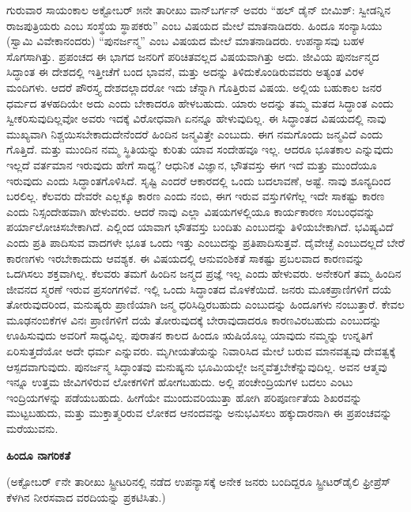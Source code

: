 ಗುರುವಾರ ಸಾಯಂಕಾಲ ಅಕ್ಟೋಬರ್​ ೫ನೇ ತಾರೀಖು ವಾನ್​ಬರ್ಗನ್​ ಅವರು “ಹಲ್​ ಡೈನ್​ ಬೀಮಿಶ್​: ಸ್ವೀಡನ್ನಿನ ರಾಜಪುತ್ರಿಯರು ಎಂಬ ಸಂಸ್ಥೆಯ ಸ್ಥಾಪಕರು” ಎಂಬ ವಿಷಯದ ಮೇಲೆ ಮಾತನಾಡಿದರು. ಹಿಂದೂ ಸಂನ್ಯಾಸಿಯು (ಸ್ವಾಮಿ ವಿವೇಕಾನಂದರು) “ಪುನರ್ಜನ್ಮ” ಎಂಬ ವಿಷಯದ ಮೇಲೆ ಮಾತನಾಡಿದರು. ಉಪನ್ಯಾಸವು ಬಹಳ ಸೊಗ\break ಸಾಗಿತ್ತು. ಪ್ರಪಂಚದ ಈ ಭಾಗದ ಜನರಿಗೆ ಪರಿಚಿತವಲ್ಲದ ವಿಷಯವಾಗಿತ್ತು ಅದು. ಜೀವಿಯ ಪುನರ್ಜನ್ಮದ ಸಿದ್ಧಾಂತ ಈ ದೇಶದಲ್ಲಿ ಇತ್ತೀಚೆಗೆ ಬಂದ ಭಾವನೆ, ಮತ್ತು ಅದನ್ನು ತಿಳಿದುಕೊಂಡಿರುವವರು ಅತ್ಯಂತ ವಿರಳ ಮಂದಿಗಳು. ಆದರೆ ಪೌರಸ್ತ್ಯ ದೇಶದಲ್ಲಾದರೋ ಇದು ಚೆನ್ನಾಗಿ ಗೊತ್ತಿರುವ ವಿಷಯ. ಅಲ್ಲಿಯ ಬಹುಕಾಲ ಜನರ ಧರ್ಮದ ತಳಹದಿಯೇ ಅದು ಎಂದು ಬೇಕಾದರೂ ಹೇಳಬಹುದು. ಯಾರು ಅದನ್ನು ತಮ್ಮ ಮತದ ಸಿದ್ಧಾಂತ ಎಂದು ಸ್ವೀಕರಿಸುವುದಿಲ್ಲವೋ ಅವರು ಇದಕ್ಕೆ ವಿರೋಧವಾಗಿ ಏನನ್ನೂ ಹೇಳುವುದಿಲ್ಲ. ಈ ಸಿದ್ಧಾಂತದ ವಿಷಯದಲ್ಲಿ ನಾವು ಮುಖ್ಯವಾಗಿ ನಿಶ್ಚಯಿಸಬೇಕಾದುದೇನೆಂದರೆ ಹಿಂದಿನ ಜನ್ಮವಿತ್ತೇ ಎಂಬುದು. ಈಗ ನಮಗೊಂದು ಜನ್ಮವಿದೆ ಎಂದು ಗೊತ್ತಿದೆ. ಮತ್ತು ಮುಂದಿನ ನಮ್ಮ ಸ್ಥಿತಿಯನ್ನು ಕುರಿತು ಯಾವ ಸಂದೇಹವೂ ಇಲ್ಲ. ಆದರೂ ಭೂತಕಾಲ ಎನ್ನುವುದು ಇಲ್ಲದೆ ವರ್ತಮಾನ ಇರುವುದು ಹೇಗೆ ಸಾಧ್ಯ? ಆಧುನಿಕ ವಿಜ್ಞಾನ, ಭೌತವಸ್ತು ಈಗ ಇದೆ ಮತ್ತು ಮುಂದೆಯೂ ಇರುವುದು ಎಂದು ಸಿದ್ಧಾಂತಗೊಳಿಸಿದೆ. ಸೃಷ್ಟಿ ಎಂದರೆ ಆಕಾರದಲ್ಲಿ ಒಂದು ಬದಲಾವಣೆ, ಅಷ್ಟೆ. ನಾವು ಶೂನ್ಯದಿಂದ ಬರಲಿಲ್ಲ. ಕೆಲವರು ದೇವರೇ ಎಲ್ಲಕ್ಕೂ ಕಾರಣ ಎಂದು ನಂಬಿ, ಈಗ ಇರುವ ವಸ್ತುಗಳಿಗೆಲ್ಲ ಇದೇ ಸಾಕಷ್ಟು ಕಾರಣ ಎಂದು ನಿಸ್ಸಂದೇಹವಾಗಿ ಹೇಳುವರು. ಆದರೆ ನಾವು ಎಲ್ಲಾ ವಿಷಯಗಳಲ್ಲಿಯೂ ಕಾರ್ಯಕಾರಣ ಸಂಬಂಧವನ್ನು ಪರ್ಯಾಲೋಚಿಸಬೇಕಾಗಿದೆ. ಎಲ್ಲಿಂದ ಯಾವಾಗ ಭೌತವಸ್ತು ಬಂದಿತು ಎಂಬುದನ್ನು ತಿಳಿಯಬೇಕಾಗಿದೆ. ಭವಿಷ್ಯವಿದೆ ಎಂದು ಪ್ರತಿ ಪಾದಿಸುವ ವಾದಗಳೇ ಭೂತ ಒಂದು ಇತ್ತು ಎಂಬುದನ್ನು ಪ್ರತಿಪಾದಿಸುತ್ತವೆ. ದೈವೇಚ್ಛೆ ಎಂಬುದಲ್ಲದೆ ಬೇರೆ ಕಾರಣಗಳು ಇರಬೇಕಾದುದು ಆವಶ್ಯಕ. ಈ ವಿಷಯದಲ್ಲಿ ಆನುವಂಶಿಕತೆ ಸಾಕಷ್ಟು ಪ್ರಬಲವಾದ ಕಾರಣವನ್ನು ಒದಗಿಸಲು ಶಕ್ತವಾಗಿಲ್ಲ. ಕೆಲವರು ತಮಗೆ ಹಿಂದಿನ ಜನ್ಮದ ಪ್ರಜ್ಞೆ ಇಲ್ಲ ಎಂದು ಹೇಳುವರು. ಅನೇಕರಿಗೆ ತಮ್ಮ ಹಿಂದಿನ ಜೀವನದ ಸ್ಮರಣೆ ಇರುವ ಪ್ರಸಂಗಗಳಿವೆ. ಇಲ್ಲಿ ಒಂದು ಸಿದ್ಧಾಂತದ ಮೊಳಕೆಯಿದೆ. ಜನರು ಮೂಕಪ್ರಾಣಿಗಳಿಗೆ ದಯೆ ತೋರುವುದರಿಂದ, ಮನುಷ್ಯರು ಪ್ರಾಣಿಯಾಗಿ ಜನ್ಮ ಧರಿಸಿದ್ದಿರಬಹುದು ಎಂಬುದನ್ನು ಹಿಂದೂಗಳು ನಂಬುತ್ತಾರೆ. ಕೇವಲ ಮೂಢನಂಬಿಕೆಗಳ ವಿನಃ ಪ್ರಾಣಿಗಳಿಗೆ ದಯೆ ತೋರುವುದಕ್ಕೆ ಬೇರಾವುದಾದರೂ ಕಾರಣವಿರಬಹುದು ಎಂಬುದನ್ನು ಊಹಿಸುವುದು ಅವರಿಗೆ ಸಾಧ್ಯವಿಲ್ಲ. ಪುರಾತನ ಕಾಲದ ಹಿಂದೂ ಋಷಿಯೊಬ್ಬ ಯಾವುದು ನಮ್ಮನ್ನು ಉನ್ನತಿಗೆ ಏರಿಸುತ್ತದೆಯೋ ಅದೇ ಧರ್ಮ ಎನ್ನುವರು. ಮೃಗೀಯತೆಯನ್ನು ನಿವಾರಿಸಿದ ಮೇಲೆ ಬರುವ ಮಾನವತ್ವವು ದೇವತ್ವಕ್ಕೆ ಆಸ್ಪದವಾಗುವುದು. ಪುನರ್ಜನ್ಮ ಸಿದ್ಧಾಂತವು ಮನುಷ್ಯನು ಭೂಮಿಯಲ್ಲೇ ಜನ್ಮವೆತ್ತಬೇಕೆನ್ನುವುದಿಲ್ಲ. ಅವನ ಆತ್ಮವು ಇನ್ನೂ ಉತ್ತಮ ಜೀವಿಗಳಿರುವ ಲೋಕಗಳಿಗೆ ಹೋಗಬಹುದು. ಅಲ್ಲಿ ಪಂಚೇಂದ್ರಿಯಗಳ ಬದಲು ಎಂಟು ಇಂದ್ರಿಯಗಳನ್ನು ಪಡೆಯಬಹುದು. ಹೀಗೆಯೇ ಮುಂದುವರಿಯುತ್ತಾ ಹೋಗಿ ಪರಿಪೂರ್ಣತೆಯ ಶಿಖರವನ್ನು ಮುಟ್ಟಬಹುದು, ಮತ್ತು ಮುಕ್ತಾತ್ಮರಿರುವ ಲೋಕದ ಆನಂದವನ್ನು ಅನುಭವಿಸಲು ಹಕ್ಕುದಾರನಾಗಿ ಈ ಪ್ರಪಂಚವನ್ನು ಮರೆಯುವನು.

\delimiter

\begin{center}
\textbf{ಹಿಂದೂ ನಾಗರಿಕತೆ}
\end{center}

(ಅಕ್ಟೋಬರ್​ ೯ನೇ ತಾರೀಖು ಸ್ಟ್ರೀಟರಿನಲ್ಲಿ ನಡೆದ ಉಪನ್ಯಾಸಕ್ಕೆ ಅನೇಕ ಜನರು ಬಂದಿದ್ದರೂ ಸ್ಟ್ರೀಟರ್​ ಡೈಲಿ ಫ್ರೀಪ್ರೆಸ್​ ಕೆಳಗಿನ ನೀರಸವಾದ ವರದಿಯನ್ನು ಪ್ರಕಟಿಸಿತು.)

